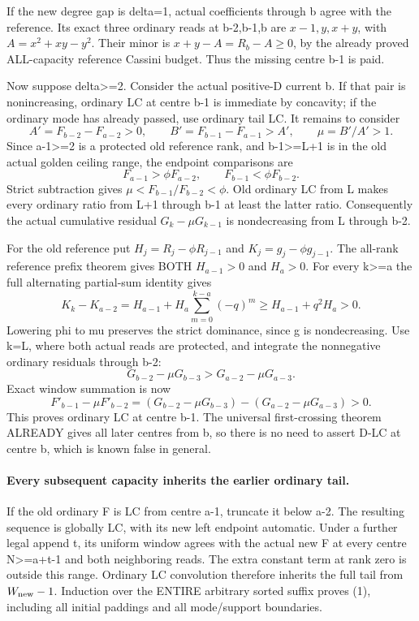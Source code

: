 If the new degree gap is delta=1, actual coefficients through b agree
with the reference. Its exact three ordinary reads at b-2,b-1,b are
$x-1,y,x+y$, with $A=x^2+xy-y^2$.
Their minor is $x+y-A=R_b-A\ge0$, by the already proved ALL-capacity
reference Cassini budget. Thus the missing centre b-1 is paid.

Now suppose delta>=2. Consider the actual positive-D current b.
If that pair is nonincreasing, ordinary LC at centre b-1 is immediate
by concavity; if the ordinary mode has already passed, use ordinary
tail LC. It remains to consider
\[
 A'=F_{b-2}-F_{a-2}>0,\qquad
 B'=F_{b-1}-F_{a-1}>A',\qquad \mu=B'/A'>1.
\]
Since a-1>=2 is a protected old reference rank, and b-1>=L+1 is
in the old actual golden ceiling range, the endpoint comparisons are
\[
 F_{a-1}>\phi F_{a-2},\qquad F_{b-1}<\phi F_{b-2}.
\]
Strict subtraction gives
$\mu<F_{b-1}/F_{b-2}<\phi$.
Old ordinary LC from L makes every ordinary ratio from L+1 through b-1
at least the latter ratio. Consequently the actual cumulative
residual $G_k-\mu G_{k-1}$ is nondecreasing from L through b-2.

For the old reference put
$H_j=R_j-\phi R_{j-1}$ and $K_j=g_j-\phi g_{j-1}$.
The all-rank reference prefix theorem gives BOTH $H_{a-1}>0$ and $H_a>0$.
For every k>=a the full alternating partial-sum identity gives
\[
 K_k-K_{a-2}
   =H_{a-1}+H_a\sum_{m=0}^{k-a}(-q)^m
                    \ge H_{a-1}+q^2H_a>0.
\]
Lowering phi to mu preserves the strict dominance, since g is
nondecreasing. Use k=L, where both actual reads are protected,
and integrate the nonnegative ordinary residuals through b-2:
\[
 G_{b-2}-\mu G_{b-3}>G_{a-2}-\mu G_{a-3}.
\]
Exact window summation is now
\[
 F'_{b-1}-\mu F'_{b-2}
 =(G_{b-2}-\mu G_{b-3})-(G_{a-2}-\mu G_{a-3})>0.
\]
This proves ordinary LC at centre b-1. The universal first-crossing
theorem ALREADY gives all later centres from b, so there is no need
to assert D-LC at centre b, which is known false in general.

\paragraph{Every subsequent capacity inherits the earlier ordinary tail.}
If the old ordinary F is LC from centre a-1, truncate it below a-2.
The resulting sequence is globally LC, with its new left endpoint
automatic. Under a further legal append t, its uniform window agrees
with the actual new F at every centre N>=a+t-1 and both neighboring reads.
The extra constant term at rank zero is outside this range.
Ordinary LC convolution therefore inherits the full tail from
$W_{\rm new}-1$. Induction over the ENTIRE arbitrary sorted suffix
proves (1), including all initial paddings and all mode/support boundaries.

